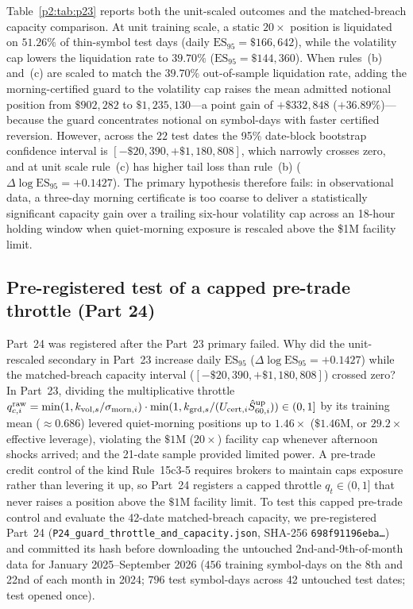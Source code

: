 Table~\ref{p2:tab:p23} reports both the unit-scaled outcomes and the matched-breach capacity comparison. At unit training scale, a static $20\times$ position is liquidated on $51.26\%$ of thin-symbol test days (daily $\mathrm{ES}_{95}=\$166{,}642$), while the volatility cap lowers the liquidation rate to $39.70\%$ ($\mathrm{ES}_{95}=\$144{,}360$). When rules~(b) and~(c) are scaled to match the $39.70\%$ out-of-sample liquidation rate, adding the morning-certified guard to the volatility cap raises the mean admitted notional position from $\$902{,}282$ to $\$1{,}235{,}130$---a point gain of $+\$332{,}848$ ($+36.89\%$)---because the guard concentrates notional on symbol-days with faster certified reversion. However, across the $22$ test dates the 95\% date-block bootstrap confidence interval is $[-\$20{,}390,+\$1{,}180{,}808]$, which narrowly crosses zero, and at unit scale rule~(c) has higher tail loss than rule~(b) ($\Delta\log\mathrm{ES}_{95}=+0.1427$). The primary hypothesis therefore fails: in observational data, a three-day morning certificate is too coarse to deliver a statistically significant capacity gain over a trailing six-hour volatility cap across an 18-hour holding window when quiet-morning exposure is rescaled above the \$1M facility limit.

\subsection{Pre-registered test of a capped pre-trade throttle (Part 24)}\label{p2:sec:p24}
Part~24 was registered after the Part~23 primary failed. Why did the unit-rescaled secondary in Part~23 increase daily $\mathrm{ES}_{95}$ ($\Delta\log\mathrm{ES}_{95}=+0.1427$) while the matched-breach capacity interval ($[-\$20{,}390,+\$1{,}180{,}808]$) crossed zero? In Part~23, dividing the multiplicative throttle $q^{\rm raw}_{c,i}=\min(1,k_{{\rm vol},s}/\sigma_{{\rm morn},i})\cdot\min(1,k_{{\rm grd},s}/(U_{{\rm cert},i}\hat S^{\rm up}_{60,i}))\in(0,1]$ by its training mean ($\approx0.686$) levered quiet-morning positions up to $1.46\times$ ($\$1.46\text{M}$, or $29.2\times$ effective leverage), violating the $\$1\text{M}$ ($20\times$) facility cap whenever afternoon shocks arrived; and the 21-date sample provided limited power. A pre-trade credit control of the kind Rule~15c3-5 requires brokers to maintain caps exposure rather than levering it up, so Part~24 registers a capped throttle $q_t\in(0,1]$ that never raises a position above the $\$1\text{M}$ facility limit. To test this capped pre-trade control and evaluate the 42-date matched-breach capacity, we pre-registered Part~24 (\texttt{P24\_guard\_throttle\_and\_capacity.json}, SHA-256 \texttt{698f91196eba\ldots}) and committed its hash before downloading the untouched 2nd-and-9th-of-month data for January 2025--September 2026 ($456$ training symbol-days on the 8th and 22nd of each month in 2024; $796$ test symbol-days across 42 untouched test dates; test opened once).

